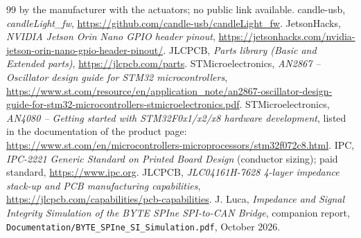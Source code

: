 \documentclass[11pt,a4paper]{article}
\begin{document}
{\begin{thebibliography}{99}
by the manufacturer with the actuators; no public link available.
 candle-usb, \textit{candleLight\_fw}, \url{https://github.com/candle-usb/candleLight_fw}.
 JetsonHacks, \textit{NVIDIA Jetson Orin Nano GPIO header pinout},
\url{https://jetsonhacks.com/nvidia-jetson-orin-nano-gpio-header-pinout/}.
 JLCPCB, \textit{Parts library (Basic and Extended parts)}, \url{https://jlcpcb.com/parts}.
 STMicroelectronics, \textit{AN2867 -- Oscillator design guide for STM32 microcontrollers},
\url{https://www.st.com/resource/en/application_note/an2867-oscillator-design-guide-for-stm32-microcontrollers-stmicroelectronics.pdf}.
 STMicroelectronics, \textit{AN4080 -- Getting started with STM32F0x1/x2/x8 hardware development},
listed in the documentation of the product page: \url{https://www.st.com/en/microcontrollers-microprocessors/stm32f072c8.html}.
 IPC, \textit{IPC-2221 Generic Standard on Printed Board Design} (conductor sizing); paid standard,
\url{https://www.ipc.org}.
 JLCPCB, \textit{JLC04161H-7628 4-layer impedance stack-up and PCB manufacturing capabilities},
\url{https://jlcpcb.com/capabilities/pcb-capabilities}.
 J. Luca, \textit{Impedance and Signal Integrity Simulation of the BYTE SPIne SPI-to-CAN Bridge},
companion report, \texttt{Documentation/BYTE\_SPIne\_SI\_Simulation.pdf}, October 2026.
\end{thebibliography}}
\end{document}
